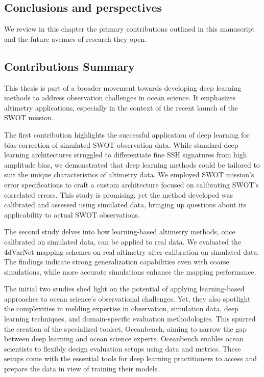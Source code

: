 \begin{bibunit}

\chapter*{Conclusions and perspectives}
\label{chap:conclusions}
We review in this chapter the primary contributions outlined in this manuscript and the future avenues of research they open.

\section*{Contributions Summary}
This thesis is part of a broader movement towards developing deep learning methods to address observation challenges in ocean science. It emphasizes altimetry applications, especially in the context of the recent launch of the SWOT mission.

The first contribution highlights the successful application of deep learning for bias correction of simulated SWOT observation data. While standard deep learning architectures struggled to differentiate fine SSH signatures from high amplitude bias, we demonstrated that deep learning methods could be tailored to suit the unique characteristics of altimetry data. We employed SWOT mission's error specifications to craft a custom architecture focused on calibrating SWOT's correlated errors. This study is promising, yet the method developed was calibrated and assessed using simulated data, bringing up questions about its applicability to actual SWOT observations.

The second study delves into how learning-based altimetry methods, once calibrated on simulated data, can be applied to real data. We evaluated the 4dVarNet mapping schemes on real altimetry after calibration on simulated data. The findings indicate strong generalization capabilities even with coarse simulations, while more accurate simulations enhance the mapping performance.

The initial two studies shed light on the potential of applying learning-based approaches to ocean science's observational challenges. Yet, they also spotlight the complexities in melding expertise in observation, simulation data, deep learning techniques, and domain-specific evaluation methodologies. This spurred the creation of the specialized toolset, Oceanbench, aiming to narrow the gap between deep learning and ocean science experts. Oceanbench enables ocean scientists to flexibly design evaluation setups using data and metrics. These setups come with the essential tools for deep learning practitioners to access and prepare the data in view of training their models.


\end{bibunit}
